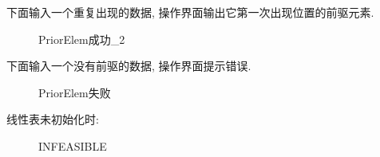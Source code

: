 \documentclass[supercite]{Experimental_Report}
\theoremstyle{definition}
\begin{document}
\noindent
下面输入一个重复出现的数据, 操作界面输出它第一次出现位置的前驱元素.
\begin{figure}[htbp]
	\centering
	\centering
	\caption{PriorElem成功\_2}
	\label{fig1-33}
\end{figure}

\noindent
下面输入一个没有前驱的数据, 操作界面提示错误.
\begin{figure}[htbp]
	\centering
	\centering
	\caption{PriorElem失败}
	\label{fig1-34}
\end{figure}

\clearpage
\noindent
线性表未初始化时:
\begin{figure}[htbp]
	\centering
	\centering
	\caption{INFEASIBLE}
	\label{fig1-35}
\end{figure}
\end{document}
